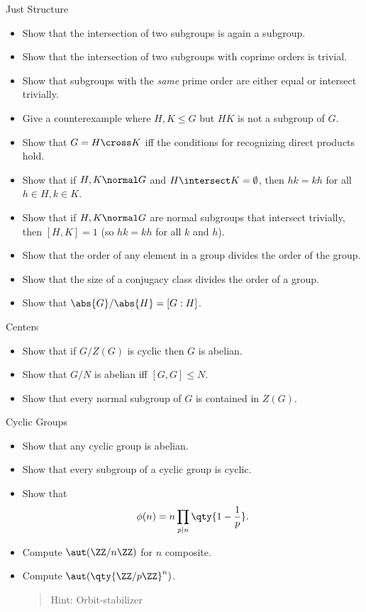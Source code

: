 Just Structure

\begin{itemize}
\tightlist
\item
  Show that the intersection of two subgroups is again a subgroup.
\item
  Show that the intersection of two subgroups with coprime orders is
  trivial.
\item
  Show that subgroups with the \emph{same} prime order are either equal
  or intersect trivially.
\item
  Give a counterexample where \(H,K\leq G\) but \(HK\) is not a subgroup
  of \(G\).
\item
  Show that \(G=H\cross K\) iff the conditions for recognizing direct
  products hold.
\item
  Show that if \(H, K \normal G\) and \(H\intersect K = \emptyset\),
  then \(hk=kh\) for all \(h\in H,k\in K\).
\item
  Show that if \(H,K\normal G\) are normal subgroups that intersect
  trivially, then \([H, K] = 1\) (so \(hk = kh\) for all \(k\) and
  \(h\)).
\item
  Show that the order of any element in a group divides the order of the
  group.
\item
  Show that the size of a conjugacy class divides the order of a group.
\item
  Show that \(\abs{G}/\abs{H} = [G: H]\).
\end{itemize}

Centers

\begin{itemize}
\tightlist
\item
  Show that if \(G/Z(G)\) is cyclic then \(G\) is abelian.
\item
  Show that \(G/N\) is abelian iff \([G, G] \leq N\).
\item
  Show that every normal subgroup of \(G\) is contained in \(Z(G)\).
\end{itemize}

Cyclic Groups

\begin{itemize}
\item
  Show that any cyclic group is abelian.
\item
  Show that every subgroup of a cyclic group is cyclic.
\item
  Show that
  \begin{align*}\phi(n) = n \prod_{p\mid n}\qty{1 - {1\over p}}.\end{align*}
\item
  Compute \(\aut(\ZZ/n\ZZ)\) for \(n\) composite.
\item
  Compute \(\aut(\qty{\ZZ/p\ZZ}^n)\).

  \begin{quote}
  Hint: Orbit-stabilizer
  \end{quote}
\end{itemize}

